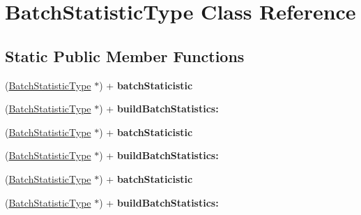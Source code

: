 \hypertarget{interface_batch_statistic_type}{
\section{BatchStatisticType Class Reference}
\label{interface_batch_statistic_type}
}
\subsection*{Static Public Member Functions}
\begin{DoxyCompactItemize}
\item 
\hypertarget{interface_batch_statistic_type_ace46603c92ac3ee22723312630736cd4}{
(\hyperlink{interface_batch_statistic_type}{BatchStatisticType} $\ast$) + {\bfseries batchStaticistic}}
\label{interface_batch_statistic_type_ace46603c92ac3ee22723312630736cd4}

\item 
\hypertarget{interface_batch_statistic_type_afbe37582e146c4e5e258db2aea37066a}{
(\hyperlink{interface_batch_statistic_type}{BatchStatisticType} $\ast$) + {\bfseries buildBatchStatistics:}}
\label{interface_batch_statistic_type_afbe37582e146c4e5e258db2aea37066a}

\item 
\hypertarget{interface_batch_statistic_type_ace46603c92ac3ee22723312630736cd4}{
(\hyperlink{interface_batch_statistic_type}{BatchStatisticType} $\ast$) + {\bfseries batchStaticistic}}
\label{interface_batch_statistic_type_ace46603c92ac3ee22723312630736cd4}

\item 
\hypertarget{interface_batch_statistic_type_afbe37582e146c4e5e258db2aea37066a}{
(\hyperlink{interface_batch_statistic_type}{BatchStatisticType} $\ast$) + {\bfseries buildBatchStatistics:}}
\label{interface_batch_statistic_type_afbe37582e146c4e5e258db2aea37066a}

\item 
\hypertarget{interface_batch_statistic_type_ace46603c92ac3ee22723312630736cd4}{
(\hyperlink{interface_batch_statistic_type}{BatchStatisticType} $\ast$) + {\bfseries batchStaticistic}}
\label{interface_batch_statistic_type_ace46603c92ac3ee22723312630736cd4}

\item 
\hypertarget{interface_batch_statistic_type_afbe37582e146c4e5e258db2aea37066a}{
(\hyperlink{interface_batch_statistic_type}{BatchStatisticType} $\ast$) + {\bfseries buildBatchStatistics:}}
\label{interface_batch_statistic_type_afbe37582e146c4e5e258db2aea37066a}

\end{DoxyCompactItemize}
